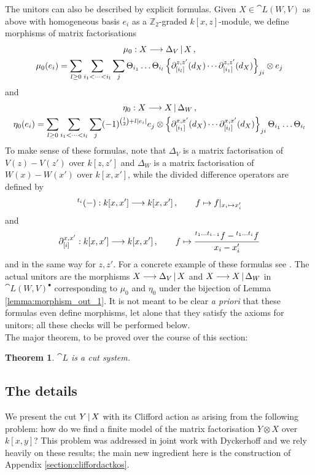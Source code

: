 \documentclass[english,letter paper,12pt,leqno]{article}
\newtheorem{theorem}{Theorem}[section]
\theoremstyle{example}
\numberwithin{equation}{section}
\begin{document}
The unitors can also be described by explicit formulas. Given $X \in \cat{L}(W,V)$ as above with homogeneous basis $e_i$ as a $\mathbb{Z}_2$-graded $k[x,z]$-module, we define morphisms of matrix factorisations
\begin{gather}
\mu_0: X \longrightarrow \Delta_V \,|\, X \,, \\
\mu_0(e_i) = \sum_{l \ge 0} \sum_{i_1 < \cdots < i_l} \sum_j \Theta_{i_1} \ldots \Theta_{i_l} \left\{ \partial^{z,z'}_{[i_l]}(d_X) \cdots \partial^{z,z'}_{[i_1]}(d_X) \right\}_{ji} \otimes e_j\label{eq:explicit_mu0}
\end{gather}
and
\begin{gather}
\eta_0: X \longrightarrow X \,|\, \Delta_W \,,\\
\eta_0(e_i) = \sum_{l \ge 0} \sum_{i_1 < \cdots < i_l} \sum_j (-1)^{\binom{l}{2} + l|e_i|} e_j \otimes \left\{ \partial^{x,x'}_{[i_1]}(d_X) \cdots \partial^{x,x'}_{[i_l]}(d_X) \right\}_{ji} \Theta_{i_1} \ldots \Theta_{i_l}
\end{gather}
To make sense of these formulas, note that $\Delta_V$ is a matrix factorisation of $V(z) - V(z')$ over $k[z,z']$ and $\Delta_W$ is a matrix factorisation of $W(x) - W(x')$ over $k[x,x']$, while the divided difference operators are defined by
\[
{}^{t_i}(-): k[x,x'] \longrightarrow k[x,x']\,, \qquad f \mapsto f|_{x_i \mapsto x'_i}
\]
and
\[
\partial^{x,x'}_{[i]}: k[x,x'] \longrightarrow k[x,x']\,, \qquad f \mapsto \frac{{}^{t_1 \ldots t_{i-1}} f - {}^{t_1 \ldots t_i} f}{x_i - x'_i}
\]
and in the same way for $z,z'$. For a concrete example of these formulas see \cite{lgdual_survey}. The actual unitors are the morphisms $X \longrightarrow \Delta_V \,|\, X$ and $X \longrightarrow X \,|\, \Delta_W$ in $\cat{L}(W,V)^\bullet$ corresponding to $\mu_0$ and $\eta_0$ under the bijection of Lemma \ref{lemma:morphism_out_1}. It is not meant to be clear \emph{a priori} that these formulas even define morphisms, let alone that they satisfy the axioms for unitors; all these checks will be performed below.
\\

The major theorem, to be proved over the course of this section:

\begin{theorem}\label{theorem:l_cut_system} $\cat{L}$ is a cut system.
\end{theorem}

\subsection{The details}

We present the cut $Y \,|\, X$ with its Clifford action as arising from the following problem: how do we find a finite model of the matrix factorisation $Y \otimes X$ over $k[x,y]$? This problem was addressed in joint work with Dyckerhoff \cite{dm1102.2957} and we rely heavily on these results; the main new ingredient here is the construction of Appendix \ref{section:cliffordactkos}.
\end{document}
